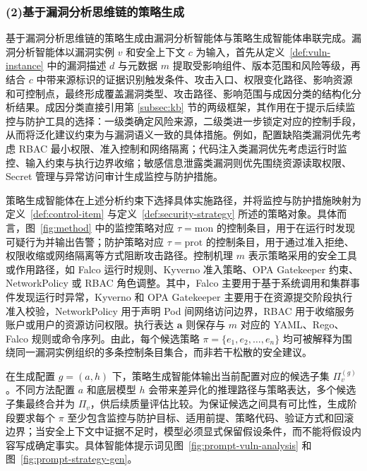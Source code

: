 \subsubsection{(2)基于漏洞分析思维链的策略生成}

基于漏洞分析思维链的策略生成由漏洞分析智能体与策略生成智能体串联完成。漏洞分析智能体以漏洞实例 $v$ 和安全上下文 $c$ 为输入，首先从定义~\ref{def:vuln-instance} 中的漏洞描述 $d$ 与元数据 $m$ 提取受影响组件、版本范围和风险等级，再结合 $c$ 中带来源标识的证据识别触发条件、攻击入口、权限变化路径、影响资源和可控制点，最终形成覆盖漏洞类型、攻击路径、影响范围与成因分类的结构化分析结果。成因分类直接引用第 \ref{subsec:kb} 节的两级框架，其作用在于提示后续监控与防护工具的选择：一级类确定风险来源，二级类进一步锁定对应的控制手段，从而将泛化建议约束为与漏洞语义一致的具体措施。例如，配置缺陷类漏洞优先考虑 RBAC 最小权限、准入控制和网络隔离；代码注入类漏洞优先考虑运行时监控、输入约束与执行边界收缩；敏感信息泄露类漏洞则优先围绕资源读取权限、Secret 管理与异常访问审计生成监控与防护措施。

策略生成智能体在上述分析约束下选择具体实施路径，并将监控与防护措施映射为定义~\ref{def:control-item} 与定义~\ref{def:security-strategy} 所述的策略对象。具体而言，图~\ref{fig:method} 中的监控策略对应 $\tau=\mathrm{mon}$ 的控制条目，用于在运行时发现可疑行为并输出告警；防护策略对应 $\tau=\mathrm{prot}$ 的控制条目，用于通过准入拒绝、权限收缩或网络隔离等方式阻断攻击路径。控制机理 $m$ 表示策略采用的安全工具或作用路径，如 Falco 运行时规则、Kyverno 准入策略、OPA Gatekeeper 约束、NetworkPolicy 或 RBAC 角色调整。其中，Falco 主要用于基于系统调用和集群事件发现运行时异常，Kyverno 和 OPA Gatekeeper 主要用于在资源提交阶段执行准入校验，NetworkPolicy 用于声明 Pod 间网络访问边界，RBAC 用于收缩服务账户或用户的资源访问权限。执行表达 $\mathbf{a}$ 则保存与 $m$ 对应的 YAML、Rego、Falco 规则或命令序列。由此，每个候选策略 $\pi=\{e_1,e_2,\ldots,e_n\}$ 均可被解释为围绕同一漏洞实例组织的多条控制条目集合，而非若干松散的安全建议。

在生成配置 $g=(a,h)$ 下，策略生成智能体输出当前配置对应的候选子集 $\Pi_v^{(g)}$。不同方法配置 $a$ 和底层模型 $h$ 会带来差异化的推理路径与策略表达，多个候选子集最终合并为 $\Pi_v$，供后续质量评估比较。为保证候选之间具有可比性，生成阶段要求每个 $\pi$ 至少包含监控与防护目标、适用前提、策略代码、验证方式和回滚边界；当安全上下文中证据不足时，模型必须显式保留假设条件，而不能将假设内容写成确定事实。具体智能体提示词见图~\ref{fig:prompt-vuln-analysis} 和图~\ref{fig:prompt-strategy-gen}。

